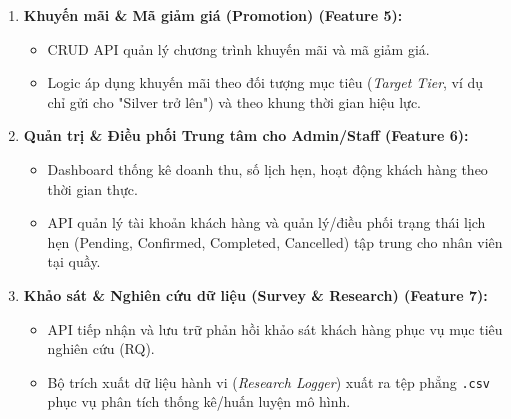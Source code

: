 \begin{enumerate}
    \item \textbf{Khuyến mãi \& Mã giảm giá (Promotion) (Feature 5):}
    \begin{itemize}
        \item CRUD API quản lý chương trình khuyến mãi và mã giảm giá.
        \item Logic áp dụng khuyến mãi theo đối tượng mục tiêu (\textit{Target Tier}, ví dụ chỉ gửi cho "Silver trở lên") và theo khung thời gian hiệu lực.
    \end{itemize}

    \item \textbf{Quản trị \& Điều phối Trung tâm cho Admin/Staff (Feature 6):}
    \begin{itemize}
        \item Dashboard thống kê doanh thu, số lịch hẹn, hoạt động khách hàng theo thời gian thực.
        \item API quản lý tài khoản khách hàng và quản lý/điều phối trạng thái lịch hẹn (Pending, Confirmed, Completed, Cancelled) tập trung cho nhân viên tại quầy.
    \end{itemize}

    \item \textbf{Khảo sát \& Nghiên cứu dữ liệu (Survey \& Research) (Feature 7):}
    \begin{itemize}
        \item API tiếp nhận và lưu trữ phản hồi khảo sát khách hàng phục vụ mục tiêu nghiên cứu (RQ).
        \item Bộ trích xuất dữ liệu hành vi (\textit{Research Logger}) xuất ra tệp phẳng \texttt{.csv} phục vụ phân tích thống kê/huấn luyện mô hình.
    \end{itemize}
\end{enumerate}